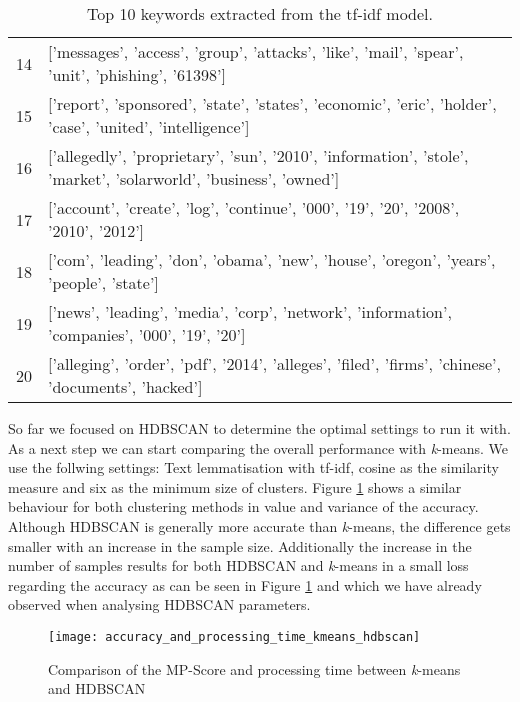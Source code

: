 \begin{table}[h]
{\begin{tabular}{rl}
            14 & ['messages', 'access', 'group', 'attacks', 'like', 'mail', 'spear', 'unit', 'phishing', '61398']                        \\
            15 & ['report', 'sponsored', 'state', 'states', 'economic', 'eric', 'holder', 'case', 'united', 'intelligence']              \\
            16 & ['allegedly', 'proprietary', 'sun', '2010', 'information', 'stole', 'market', 'solarworld', 'business', 'owned']        \\
            17 & ['account', 'create', 'log', 'continue', '000', '19', '20', '2008', '2010', '2012']                                     \\
            18 & ['com', 'leading', 'don', 'obama', 'new', 'house', 'oregon', 'years', 'people', 'state']                                \\
            19 & ['news', 'leading', 'media', 'corp', 'network', 'information', 'companies', '000', '19', '20']                          \\
            20 & ['alleging', 'order', 'pdf', '2014', 'alleges', 'filed', 'firms', 'chinese', 'documents', 'hacked']                     \\
        \hline
        \end{tabular}
        }
        \caption{Top 10 keywords extracted from the tf-idf model.}
        \label{tab:clustering_example_features}
\end{table}

So far we focused on HDBSCAN to determine the optimal settings to run it with. As a next step we can start comparing the overall performance with \textit{k}-means. We use the follwing settings: Text lemmatisation with tf-idf, cosine as the similarity measure and six as the minimum size of clusters. Figure \ref{fig:accuracy_and_processing_time_kmeans_hdbscan} shows a similar behaviour for both clustering methods in value and variance of the accuracy. Although HDBSCAN is generally more accurate than \textit{k}-means, the difference gets smaller with an increase in the sample size. Additionally the increase in the number of samples results for both HDBSCAN and \textit{k}-means in a small loss regarding the accuracy as can be seen in Figure \ref{fig:accuracy_and_processing_time_kmeans_hdbscan} and which we have already observed when analysing HDBSCAN parameters.

\begin{figure}[h]
    \centering
    \texttt{[image: accuracy\_and\_processing\_time\_kmeans\_hdbscan]}
    \caption{Comparison of the MP-Score and processing time between \textit{k}-means and HDBSCAN}
    \label{fig:accuracy_and_processing_time_kmeans_hdbscan}
\end{figure}

